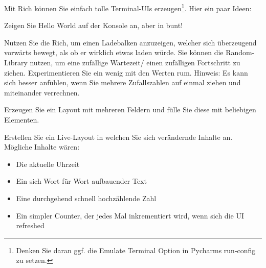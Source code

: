 \documentclass{ubo_tex_uebungszettel/uebungszettel}
\theoremstyle{definition}
\begin{document}
	
		\newpage
		\begin{aufg}[Rich] \quad
			  Mit Rich können Sie einfach tolle Terminal-UIs erzeugen\footnote{Denken Sie daran ggf. die Emulate Terminal Option in Pycharms run-config zu setzen.}. 
			  \newline
			  Hier ein paar Ideen:\newline
			  
			  \noindent {} \quad
			  
			  \noindent Zeigen Sie Hello World auf der Konsole an, aber in bunt!
			  
			  	\medskip
			  \medskip
			  
			  \noindent {} \quad
			  
			  \noindent Nutzen Sie die Rich, um einen Ladebalken anzuzeigen, welcher sich überzeugend vorwärts bewegt, als ob er wirklich etwas laden würde. Sie können die Random-Library nutzen, um eine zufällige Wartezeit/ einen zufälligen Fortschritt zu ziehen. Experimentieren Sie ein wenig mit den Werten rum.\newline
			  Hinweis: Es kann sich besser anfühlen, wenn Sie mehrere Zufallszahlen auf einmal ziehen und miteinander verrechnen.
			  
			  	\medskip
			  \medskip
			  
			  \noindent {} \quad
			  
			  \noindent Erzeugen Sie ein Layout mit mehreren Feldern und fülle Sie diese mit beliebigen Elementen.
			  
			  
			  	\medskip
			  \medskip
			  
  			  \noindent {} \quad
			  
			  Erstellen Sie ein Live-Layout in welchen Sie sich verändernde Inhalte an.\newline
			  Mögliche Inhalte wären:
			  \begin{itemize}
			  	    \item Die aktuelle Uhrzeit
			  	    \item Ein sich Wort für Wort aufbauender Text
			  		\item Eine durchgehend schnell hochzählende Zahl
			  		\item Ein simpler Counter, der jedes Mal inkrementiert wird, wenn sich die UI refreshed
			  \end{itemize}
			  
			  	\medskip
			  \medskip
			  
			  \noindent {} \quad
			  

\end{aufg}
\end{document}
